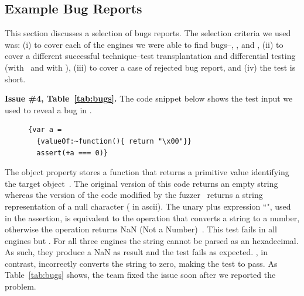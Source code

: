 \documentclass[10pt,conference,anonymous]{IEEEtran}
\begin{document}
\subsection{Example Bug Reports}

This section discusses a selection of bugs reports. The selection
criteria we used was: (i) to cover each of the engines we were able to
find bugs--\chakra, \jsc, and \veight, (ii) to cover a different
successful technique--test transplantation and differential testing
(with \radamsa\ and with \quickfuzz), (iii) to cover a case of
rejected bug report, and (iv) the test is short.


\sloppy
\vspace{1ex}\noindent\textbf{Issue \#4, Table~\ref{tab:bugs}.} The
code snippet below shows the test input we used to reveal a bug in
\chakra.

\begin{figure}[h!]
  \centering
  \scriptsize
  \begin{lstlisting}
{var a =
  {valueOf:~function(){ return "\x00"}}
  assert(+a === 0)}
  \end{lstlisting}
  \normalsize
\end{figure}

The object property  stores a function that returns a
primitive value identifying the target object~\cite{valueof}. The
original version of this code returns an empty string whereas the
version of the code modified by the \radamsa{} fuzzer~\cite{radamsa}
returns a string representation of a null character ( in
ascii). The unary plus expression ``", used in the
assertion, is equivalent to the operation
 that converts a string to a number,
otherwise the operation returns NaN (Not a
Number)~\cite{unary-plus}. This test fails in all engines but
\chakra{}. For all three engines the string cannot be parsed as an
hexadecimal. As such, they produce a NaN as result and the test fails
as expected. \chakra{}, in contrast, incorrectly converts the string
to zero, making the test to pass. As Table~\ref{tab:bugs} shows, the
\chakra{} team fixed the issue soon after we reported the problem.
\end{document}
